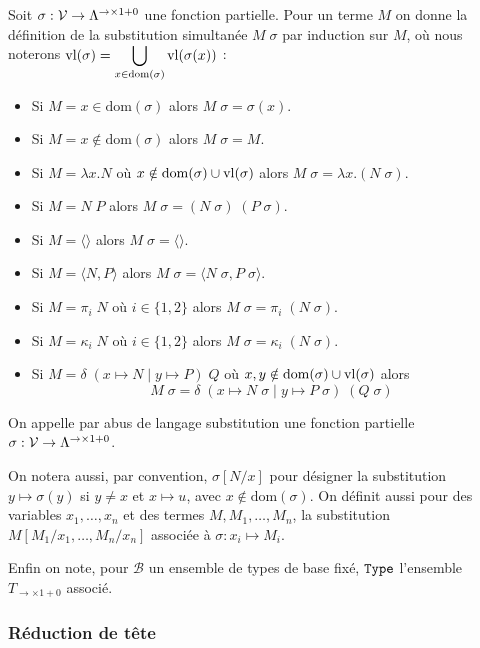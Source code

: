 \begin{defi}
    Soit $\sigma : \mathcal V\to\Lambda^{\to\times1+0}$ une fonction partielle. Pour un terme $M$ on donne la définition de la substitution simultanée $M\;\sigma$ par induction sur $M$, où nous noterons $\mathrm{vl}(\sigma) = \displaystyle{\bigcup_{x\in\mathrm{dom}(\sigma)}\mathrm{vl}(\sigma(x))}$ :
    \begin{itemize}[label=$\bullet$]
        \item Si $M = x \in\mathrm{dom}(\sigma)$ alors $M\;\sigma = \sigma(x)$.
        \item Si $M = x \notin\mathrm{dom}(\sigma)$ alors $M\;\sigma = M$.
        \item Si $M = \lambda x.N$ où $x\notin\mathrm{dom}(\sigma)\cup\mathrm{vl}(\sigma)$ alors $M\;\sigma = \lambda x.(N\;\sigma)$.
        \item Si $M = N\;P$ alors $M\;\sigma = (N\;\sigma)\;(P\;\sigma)$.
        \item Si $M = \langle\rangle$ alors $M\;\sigma = \langle\rangle$.
        \item Si $M = \langle N,P\rangle$ alors $M\;\sigma = \langle N\;\sigma,P\;\sigma\rangle$.
        \item Si $M = \pi_i\;N$ où $i\in\{1,2\}$ alors $M\;\sigma = \pi_i\;(N\;\sigma)$.
        \item Si $M = \kappa_i\;N$ où $i\in\{1,2\}$ alors $M\;\sigma = \kappa_i\;(N\;\sigma)$.
        \item Si $M = \delta\;(x\mapsto N\mid y\mapsto P)\;Q$ où $x,y\notin\mathrm{dom}(\sigma)\cup\mathrm{vl}(\sigma)$ alors $$M\;\sigma = \delta\;(x\mapsto N\;\sigma\mid y\mapsto P\;\sigma)\;(Q\;\sigma)$$
    \end{itemize}

    On appelle par abus de langage substitution une fonction partielle $\sigma : \mathcal V\to\Lambda^{\to\times1+0}$.
\end{defi}

On notera aussi, par convention, $\sigma[N/x]$ pour désigner la substitution $y\mapsto\sigma(y)$ si $y\neq x$ et $x\mapsto u$, avec $x\notin\mathrm{dom}(\sigma)$. On définit aussi pour des variables $x_1,\ldots,x_n$ et des termes $M,M_1,\ldots,M_n$, la substitution $M[M_1/x_1,\ldots,M_n/x_n]$ associée à $\sigma : x_i\mapsto M_i$.

Enfin on note, pour $\mathcal B$ un ensemble de types de base fixé, $\texttt{Type}$ l'ensemble $T_{\to\times 1+0}$ associé.

\subsubsection{Réduction de tête}

